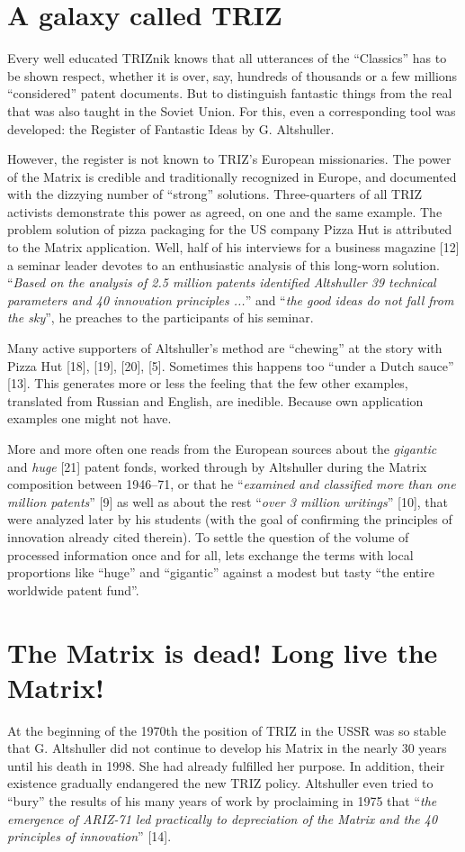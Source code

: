 \documentclass[11pt,a4paper]{article}
\begin{document}
\section*{A galaxy called TRIZ}
Every well educated TRIZnik knows that all utterances of the ``Classics'' has
to be shown respect, whether it is over, say, hundreds of thousands or a few
millions ``considered'' patent documents. But to distinguish fantastic things
from the real that was also taught in the Soviet Union. For this, even a
corresponding tool was developed: the Register of Fantastic Ideas by
G. Altshuller.

However, the register is not known to TRIZ's European missionaries. The power
of the Matrix is credible and traditionally recognized in Europe, and
documented with the dizzying number of ``strong'' solutions. Three-quarters of
all TRIZ activists demonstrate this power as agreed, on one and the same
example. The problem solution of pizza packaging for the US company Pizza Hut
is attributed to the Matrix application. Well, half of his interviews for a
business magazine [12] a seminar leader devotes to an enthusiastic analysis of
this long-worn solution.  ``\emph{Based on the analysis of 2.5 million patents
  identified Altshuller 39 technical parameters and 40 innovation principles
  ...}'' and ``\emph{the good ideas do not fall from the sky}'', he preaches
to the participants of his seminar.

Many active supporters of Altshuller's method are ``chewing'' at the story
with Pizza Hut [18], [19], [20], [5]. Sometimes this happens too ``under a
Dutch sauce'' [13].  This generates more or less the feeling that the few
other examples, translated from Russian and English, are inedible. Because own
application examples one might not have.

More and more often one reads from the European sources about the
\emph{gigantic} and \emph{huge} [21] patent fonds, worked through by
Altshuller during the Matrix composition between 1946--71, or that he
``\emph{examined and classified more than one million patents}'' [9] as well
as about the rest ``\emph{over 3 million writings}'' [10], that were analyzed
later by his students (with the goal of confirming the principles of
innovation already cited therein). To settle the question of the volume of
processed information once and for all, lets exchange the terms with local
proportions like ``huge'' and ``gigantic'' against a modest but tasty ``the
entire worldwide patent fund''.

\section*{The Matrix is dead! Long live the Matrix!}
At the beginning of the 1970th the position of TRIZ in the USSR was so stable
that G. Altshuller did not continue to develop his Matrix in the nearly 30
years until his death in 1998. She had already fulfilled her purpose. In
addition, their existence gradually endangered the new TRIZ policy. Altshuller
even tried to ``bury'' the results of his many years of work by proclaiming in
1975 that ``\emph{the emergence of ARIZ-71 led practically to depreciation of
  the Matrix and the 40 principles of innovation}'' [14].
\end{document}
